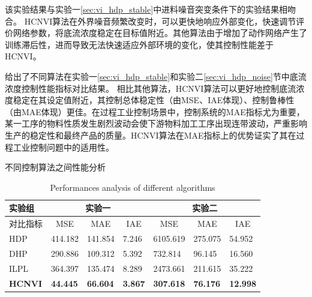 该实验结果与实验一\ref{sec:vi_hdp_stable}中进料噪音突变条件下的实验结果相吻合。
HCNVI算法在外界噪音频繁改变时，可以更快地响应外部变化，快速调节评价网络参数，将底流浓度稳定在目标值附近。其他算法由于增加了动作网络产生了训练滞后性，进而导致无法快速适应外部环境的变化，使其控制性能差于HCNVI。

给出了不同算法在实验一\ref{sec:vi_hdp_stable}和实验二\ref{sec:vi_hdp_noise}节中底流浓度控制性能指标对比结果。
相比其他算法，HCNVI算法可以更好地控制底流浓度稳定在其设定值附近，其控制总体稳定性（由MSE、IAE体现）、控制鲁棒性（由MAE体现）更佳。在过程工业控制场景中，控制系统的MAE指标尤为重要，某一工序的物料性质发生剧烈波动会使下游物料加工工序出现连带波动，严重影响生产的稳定性和最终产品的质量。HCNVI算法在MAE指标上的优势证实了其在过程工业控制问题中的适用性。


\begin{table}[htbp]

\caption{不同控制算法之间性能分析}
    \addtocounter{table}{-1}
    \vspace{-0.2cm}
    \renewcommand{\tablename}{Table}
    \caption{Performances analysis of different algorithms}
    \renewcommand{\tablename}{表}
    \vspace{0.4cm}
\begin{tabular}{|l|lll|lll|}
\hline
实验组 & \multicolumn{3}{c|}{实验一} & \multicolumn{3}{c|}{实验二} \\
\hline 对比指标 & \multicolumn{1}{c}{MSE\footnotemark[1]} &
\multicolumn{1}{c}{MAE\footnotemark[2]} &
\multicolumn{1}{c|}{IAE\footnotemark[3]} & \multicolumn{1}{c}{MSE} &
\multicolumn{1}{c}{MAE} & \multicolumn{1}{c|}{IAE} \\ \hline
HDP & 414.182& 141.854 & 7.246 & 6105.619 & 275.075 & 54.952 \\
DHP & 290.886 & 109.312 & 5.392 & 732.814 & 96.145 & 16.560 \\
ILPL & 364.397 & 135.474 & 8.289 & 2473.661 &211.615 & 35.222 \\
\textbf{HCNVI} & \textbf{44.445} & \textbf{66.604} & \textbf{3.867} & \textbf{307.618} & \textbf{76.176} & \textbf{12.998} \\
\hline
\end{tabular}%
\label{tab:MSE_cmp} \centering
\end{table}

  


